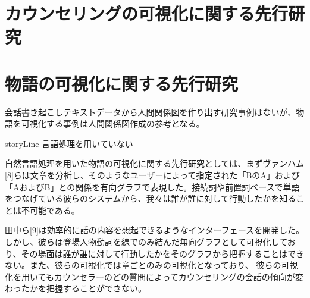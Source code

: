 \documentclass[shuuron]{kuee}
\begin{document}

\section{カウンセリングの可視化に関する先行研究}

\section{物語の可視化に関する先行研究}

会話書き起こしテキストデータから人間関係図を作り出す研究事例はないが、物語を可視化する事例は人間関係図作成の参考となる。

storyLine
言語処理を用いていない

自然言語処理を用いた物語の可視化に関する先行研究としては、まずヴァンハム[8]らは文章を分析し、そのようなユーザーによって指定された「BのA」および「AおよびB」との関係を有向グラフで表現した。接続詞や前置詞ベースで単語をつなげている彼らのシステムから、我々は誰が誰に対して行動したかを知ることは不可能である。

田中ら[9]は効率的に話の内容を想起できるようなインターフェースを開発した。しかし、彼らは登場人物動詞を線でのみ結んだ無向グラフとして可視化しており、その場面は誰が誰に対して行動したかをそのグラフから把握することはできない。また、彼らの可視化では章ごとのみの可視化となっており、 彼らの可視化を用いてもカウンセラーのどの質問によってカウンセリングの会話の傾向が変わったかを把握することができない。
\end{document}
